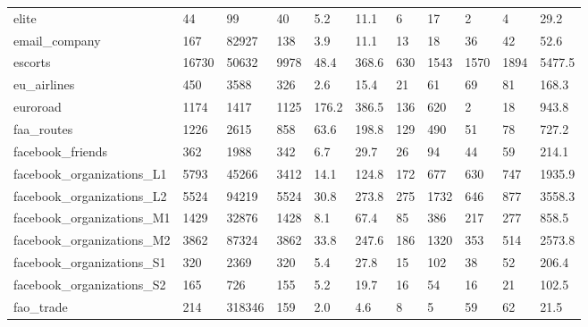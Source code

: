 \begin{longtable}{lllllllllll}
 elite                                              & 44         & 99        & 40    & 5.2    & 11.1   & 6     & 17     & 2      & 4      & 29.2    \\
 email\_company                                      & 167        & 82927     & 138   & 3.9    & 11.1   & 13    & 18     & 36     & 42     & 52.6    \\
 escorts                                            & 16730      & 50632     & 9978  & 48.4   & 368.6  & 630   & 1543   & 1570   & 1894   & 5477.5  \\
 eu\_airlines                                        & 450        & 3588      & 326   & 2.6    & 15.4   & 21    & 61     & 69     & 81     & 168.3   \\
 euroroad                                           & 1174       & 1417      & 1125  & 176.2  & 386.5  & 136   & 620    & 2      & 18     & 943.8   \\
 faa\_routes                                         & 1226       & 2615      & 858   & 63.6   & 198.8  & 129   & 490    & 51     & 78     & 727.2   \\
 facebook\_friends                                   & 362        & 1988      & 342   & 6.7    & 29.7   & 26    & 94     & 44     & 59     & 214.1   \\
 facebook\_organizations\_L1                          & 5793       & 45266     & 3412  & 14.1   & 124.8  & 172   & 677    & 630    & 747    & 1935.9  \\
 facebook\_organizations\_L2                          & 5524       & 94219     & 5524  & 30.8   & 273.8  & 275   & 1732   & 646    & 877    & 3558.3  \\
 facebook\_organizations\_M1                          & 1429       & 32876     & 1428  & 8.1    & 67.4   & 85    & 386    & 217    & 277    & 858.5   \\
 facebook\_organizations\_M2                          & 3862       & 87324     & 3862  & 33.8   & 247.6  & 186   & 1320   & 353    & 514    & 2573.8  \\
 facebook\_organizations\_S1                          & 320        & 2369      & 320   & 5.4    & 27.8   & 15    & 102    & 38     & 52     & 206.4   \\
 facebook\_organizations\_S2                          & 165        & 726       & 155   & 5.2    & 19.7   & 16    & 54     & 16     & 21     & 102.5   \\
 fao\_trade                                          & 214        & 318346    & 159   & 2.0    & 4.6    & 8     & 5      & 59     & 62     & 21.5    \\

\end{longtable}
